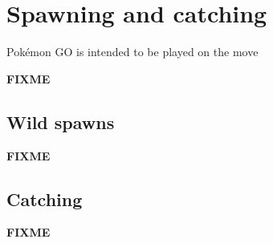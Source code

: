 \chapter{Spawning and catching}
Pokémon GO is intended to be played on the move

\label{chap:spawn}
\textbf{FIXME}

\section{Wild spawns}
\label{sec:spawns}
\textbf{FIXME}

\section{Catching}
\label{sec:catch}
\textbf{FIXME}

